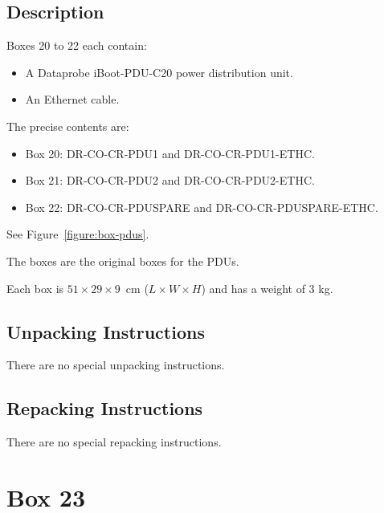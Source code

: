\documentclass{article}
\begin{document}
\subsection{Description}

Boxes 20 to 22 each contain:

\begin{itemize}
    \item A Dataprobe iBoot-PDU-C20 power distribution unit.
    \item An Ethernet cable.
\end{itemize}

The precise contents are:

\begin{itemize}
    \item Box 20: DR-CO-CR-PDU1 and DR-CO-CR-PDU1-ETHC.
    \item Box 21: DR-CO-CR-PDU2 and DR-CO-CR-PDU2-ETHC.
    \item Box 22: DR-CO-CR-PDUSPARE and DR-CO-CR-PDUSPARE-ETHC.
\end{itemize}

See Figure~\ref{figure:box-pdus}.

The boxes are the original boxes for the PDUs.

Each box is  $51 \times 29 \times 9$~cm ($L \times W \times H$) and has a weight of 3 kg.


\subsection{Unpacking Instructions}

There are no special unpacking instructions.

\subsection{Repacking Instructions}

There are no special repacking instructions.


\clearpage
\section{Box 23}
\end{document}
